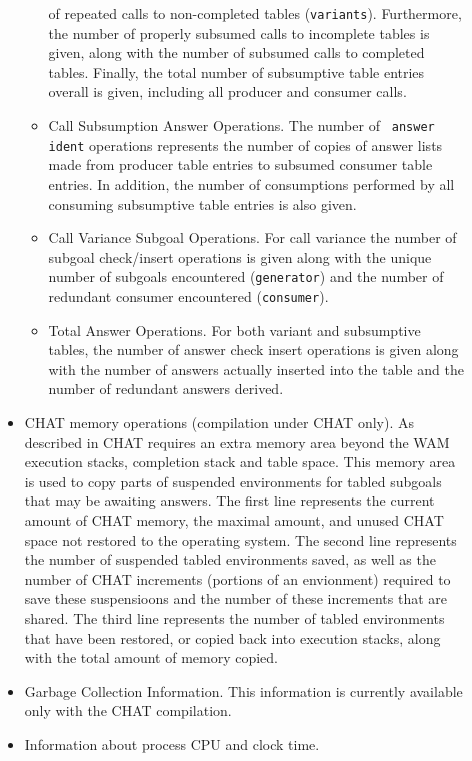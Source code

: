 \begin{description}
\begin{itemize}
\begin{itemize}
of repeated calls to non-completed tables ({\tt variants}).
Furthermore, the number of properly subsumed calls to incomplete
tables is given, along with the number of subsumed calls to completed
tables.  Finally, the total number of subsumptive table entries
overall is given, including all producer and consumer calls.
%
\item Call Subsumption Answer Operations.  The number of {\tt
answer ident} operations represents the number of copies of answer
lists made from producer table entries to subsumed consumer table
entries.  In addition, the number of consumptions performed by all
consuming subsumptive table entries is also given.
%
\item Call Variance Subgoal Operations.  For call variance the number
of subgoal check/insert operations is given along with the unique
number of subgoals encountered ({\tt generator}) and the number of
redundant consumer encountered ({\tt consumer}).
%
\item Total Answer Operations.  For both variant and subsumptive
tables, the number of answer check insert operations is given along
with the number of answers actually inserted into the table and the
number of redundant answers derived.
\end{itemize}
%
\item CHAT memory operations (compilation under CHAT only).  As
described in \cite{CHAT@PADL-99} CHAT requires an extra memory area
beyond the WAM execution stacks, completion stack and table space.
This memory area is used to copy parts of suspended environments for
tabled subgoals that may be awaiting answers.  The first line
represents the current amount of CHAT memory, the maximal amount, and
unused CHAT space not restored to the operating system.  The second
line represents the number of suspended tabled environments saved, as
well as the number of CHAT increments (portions of an envionment)
required to save these suspensioons and the number of these increments
that are shared.  The third line represents the number of tabled
environments that have been restored, or copied back into execution
stacks, along with the total amount of memory copied.

\item Garbage Collection Information.  This information is currently
available only with the CHAT compilation.

\item Information about process CPU and clock time.
    \end{itemize}


\end{description}

